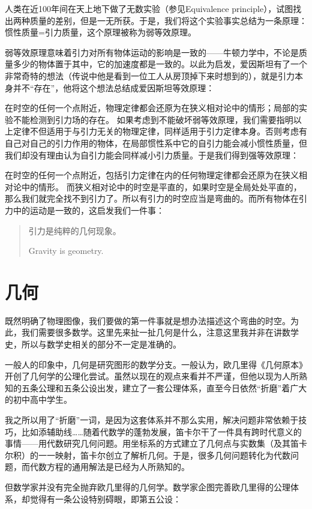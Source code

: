 \documentclass{ctexart}
\begin{document}
人类在近100年间在天上地下做了无数实验（参见Equivalence principle），试图找出两种质量的差别，但是一无所获。于是，我们将这个实验事实总结为一条原理：惯性质量=引力质量，这个原理被称为弱等效原理。


弱等效原理意味着引力对所有物体运动的影响是一致的——牛顿力学中，不论是质量多少的物体置于其中，它的加速度都是一致的。以此为启发，爱因斯坦有了一个非常奇特的想法（传说中他是看到一位工人从房顶掉下来时想到的），就是引力本身并不“存在”，他将这个想法总结成爱因斯坦等效原理：

在时空的任何一个点附近，物理定律都会还原为在狭义相对论中的情形；局部的实验不能检测到引力场的存在。
如果考虑到不能破坏弱等效原理，我们需要指明以上定律不但适用于与引力无关的物理定律，同样适用于引力定律本身。否则考虑有自己对自己的引力作用的物体，在局部惯性系中它的自引力能会减小惯性质量，但我们却没有理由认为自引力能会同样减小引力质量。于是我们得到强等效原理：

在时空的任何一个点附近，包括引力定律在内的任何物理定律都会还原为在狭义相对论中的情形。
而狭义相对论中的时空是平直的，如果时空是全局处处平直的，那么我们就完全找不到引力了。所以有引力的时空应当是弯曲的。而所有物体在引力中的运动是一致的，这启发我们一件事：

\begin{quotation}
引力是纯粹的几何现象。

Gravity is geometry.
\end{quotation}

\section{几何}
既然明确了物理图像，我们要做的第一件事就是想办法描述这个弯曲的时空。为此，我们需要很多数学。这里先来扯一扯几何是什么，注意这里我并非在讲数学史，所以与数学史相关的部分不一定是准确的。

一般人的印象中，几何是研究图形的数学分支。一般认为，欧几里得《几何原本》开创了几何学的公理化尝试。虽然以现在的观点来看并不严谨，但他以现为人所熟知的五条公理和五条公设出发，建立了一套公理体系，直至今日依然“折磨”着广大的初中高中学生。

我之所以用了“折磨”一词，是因为这套体系并不那么实用，解决问题非常依赖于技巧，比如添辅助线……随着代数学的蓬勃发展，笛卡尔干了一件具有跨时代意义的事情——用代数研究几何问题。用坐标系的方式建立了几何点与实数集（及其笛卡尔积）的一一映射，笛卡尔创立了解析几何。于是，很多几何问题转化为代数问题，而代数方程的通用解法是已经为人所熟知的。

但数学家并没有完全抛弃欧几里得的几何学。数学家企图完善欧几里得的公理体系，却觉得有一条公设特别碍眼，即第五公设：
\end{document}
